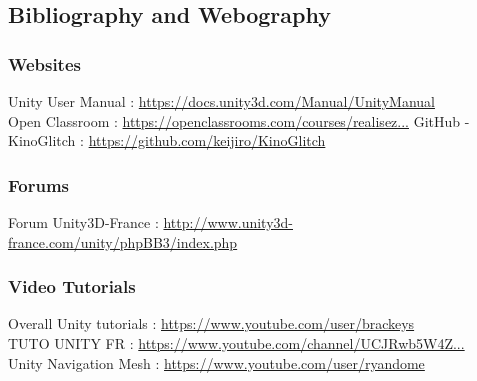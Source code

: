 \documentclass[12pt]{article}
\begin{document}
        
        
    \subsection{Bibliography and Webography}
    
    	\subsubsection{Websites}
        
        	Unity User Manual : \url{https://docs.unity3d.com/Manual/UnityManual}\\
            Open Classroom : \url{https://openclassrooms.com/courses/realisez...}
            GitHub - KinoGlitch : \url{https://github.com/keijiro/KinoGlitch}
            
        \subsubsection{Forums}
        
        	Forum Unity3D-France : \url{http://www.unity3d-france.com/unity/phpBB3/index.php}
            
        \subsubsection{Video Tutorials}
        
        	Overall Unity tutorials : \url{https://www.youtube.com/user/brackeys}\\
            TUTO UNITY FR : \url{https://www.youtube.com/channel/UCJRwb5W4Z...}\\
        	Unity Navigation Mesh : \url{https://www.youtube.com/user/ryandome}\\
\end{document}
